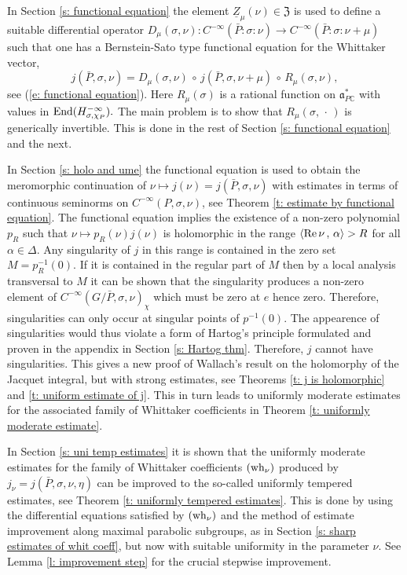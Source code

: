\documentclass[12pt,a4paper]{article}
\def\msy#1{{\mathbb #1}}
\def\C{{\msy C}}
\def\ga{\alpha}
\def\gs{\sigma}
\def\gD{\Delta}
\def\got#1{\mathfrak #1}
\def\fa{{\got a}}
\def\to{\rightarrow}
\def\Re{{\rm Re}\,}
\def\inp#1#2{\langle#1\,,\,#2\rangle}
\def\End{{\rm End}}
\def\after{\,{\scriptstyle\circ}\,}
\def\iC{{\scriptscriptstyle \C}}
\numberwithin{Thm}{section}
\numberwithin{equation}{section}
\def\dotvar{\, \cdot\,}
\def\fZ{{\mathfrak Z}}
\def\faPdc{{\fa_{P\iC}^*}}
\numberwithin{equation}{section}
\def\fZ{{\mathfrak Z}}
\def\faPdc{\fa_{P\iC}^*}
\def\wh{{\rm wh}}
\def\cchi{\chi}
\begin{document}
In Section \ref{s: functional equation} the element $\underline{Z}_\mu(\nu) \in \fZ$ is used to define a suitable differential operator
$D_\mu(\gs, \nu): C^{-\infty}(\bar P:\gs: \nu) \to C^{-\infty}(\bar P:\gs: \nu + \mu)$ such that 
one has a Bernstein-Sato type functional equation for the Whittaker vector, 
$$ 
j(\bar P,\gs , \nu ) = D_\mu(\gs, \nu) \after j(\bar P,\gs, \nu + \mu) \after R_\mu(\gs, \nu),
$$%
see (\ref{e: functional equation}). Here $R_\mu(\gs)$ is a rational function on $\faPdc$ 
with values in $\End(H_{\gs,\cchi_P}^{-\infty}).$ The main problem is to show that 
$R_\mu(\gs, \dotvar)$ is generically invertible. This is done in the rest of Section 
\ref{s: functional equation} and the next.

In Section \ref{s: holo and ume}  the functional equation is used to obtain the meromorphic continuation
of $\nu \mapsto j(\nu) = j(\bar P, \gs, \nu)$ with estimates in terms of continuous seminorms 
on $C^{-\infty}(P, \gs, \nu)$, see Theorem \ref{t: estimate by functional equation}. 
The functional equation implies the existence of a non-zero polynomial $p_R$ 
such that $\nu \mapsto p_R(\nu) j(\nu)$ is holomorphic in the range $\inp{\Re\nu}{\ga} > R$ 
for all $\ga\in\gD.$ Any singularity of $j$ in this range is contained in the
zero set $M= p_R^{-1}(0).$ If it is contained in the regular part of $M$ then by a local 
analysis transversal to $M$ it can be shown that the singularity produces
a non-zero element of $C^{-\infty}(G/\bar P, \gs, \nu)_\cchi$ which must be zero at
$e$ hence zero. Therefore, singularities can only occur at singular points of $p^{-1}(0).$ The appearence of singularities would thus violate
a form of Hartog's principle formulated and proven in the appendix in Section \ref{s: Hartog thm}. 
Therefore, $j$ cannot have singularities. This gives a new proof of Wallach's
result \cite[Thm.~15.4.1]{Wrrg2} on the holomorphy of the Jacquet integral, but with strong estimates, see Theorems \ref{t: j is holomorphic} and \ref{t: uniform estimate of j}. This in turn leads to uniformly moderate
estimates for the associated family of Whittaker coefficients in Theorem \ref{t: uniformly moderate estimate}. 

In Section \ref{s: uni temp estimates}  it is shown that the uniformly moderate estimates
for the family of Whittaker coefficients
$(\wh_\nu)$ produced by $j_\nu = j(\bar P,\gs,\nu,\eta)$ can be improved to the so-called 
uniformly tempered estimates, see Theorem \ref{t: uniformly tempered estimates}. 
This is done by using the differential equations satisfied by $(\wh_\nu)$ and 
the method of estimate improvement along maximal parabolic subgroups, as in 
Section \ref{s: sharp estimates of whit coeff}, but now with suitable uniformity in the parameter $\nu.$ 
See Lemma \ref{l: improvement step} for the crucial stepwise improvement. 
\end{document}
